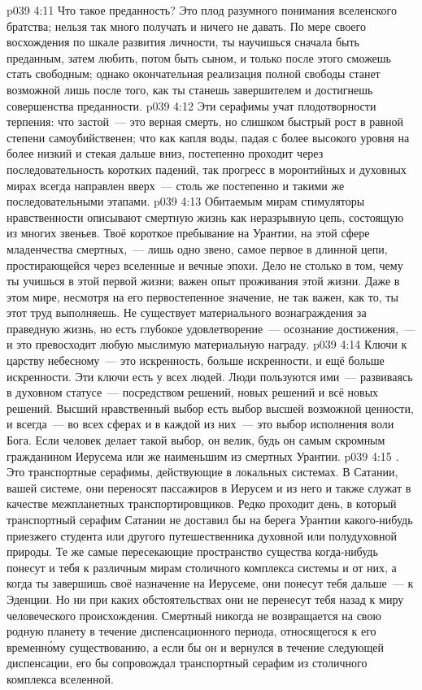 \vs p039 4:11 Что такое преданность? Это плод разумного понимания вселенского братства; нельзя так много получать и ничего не давать. По мере своего восхождения по шкале развития личности, ты научишься сначала быть преданным, затем любить, потом быть сыном, и только после этого сможешь стать свободным; однако окончательная реализация полной свободы станет возможной лишь после того, как ты станешь завершителем и достигнешь совершенства преданности.
\vs p039 4:12 \pc Эти серафимы учат плодотворности терпения: что застой~--- это верная смерть, но слишком быстрый рост в равной степени самоубийственен; что как капля воды, падая с более высокого уровня на более низкий и стекая дальше вниз, постепенно проходит через последовательность коротких падений, так прогресс в моронтийных и духовных мирах всегда направлен вверх~--- столь же постепенно и такими же последовательными этапами.
\vs p039 4:13 Обитаемым мирам стимуляторы нравственности описывают смертную жизнь как неразрывную цепь, состоящую из многих звеньев. Твоё короткое пребывание на Урантии, на этой сфере младенчества смертных,~--- лишь одно звено, самое первое в длинной цепи, простирающейся через вселенные и вечные эпохи. Дело не столько в том, чему ты учишься в этой первой жизни; важен опыт проживания этой жизни. Даже  в этом мире, несмотря на его первостепенное значение, не так важен, как то,  ты этот труд выполняешь. Не существует материального вознаграждения за праведную жизнь, но есть глубокое удовлетворение~--- осознание достижения,~--- и это превосходит любую мыслимую материальную награду.
\vs p039 4:14 Ключи к царству небесному~--- это искренность, больше искренности, и ещё больше искренности. Эти ключи есть у всех людей. Люди пользуются ими~--- развиваясь в духовном статусе~--- посредством решений, новых решений и всё новых решений. Высший нравственный выбор есть выбор высшей возможной ценности, и всегда~--- во всех сферах и в каждой из них~--- это выбор исполнения воли Бога. Если человек делает такой выбор, он  велик, будь он самым скромным гражданином Иерусема или же наименьшим из смертных Урантии.
\vs p039 4:15 . Это транспортные серафимы, действующие в локальных системах. В Сатании, вашей системе, они переносят пассажиров в Иерусем и из него и также служат в качестве межпланетных транспортировщиков. Редко проходит день, в который транспортный серафим Сатании не доставил бы на берега Урантии какого\hyp{}нибудь приезжего студента или другого путешественника духовной или полудуховной природы. Те же самые пересекающие пространство существа когда\hyp{}нибудь понесут и тебя к различным мирам столичного комплекса системы и от них, а когда ты завершишь своё назначение на Иерусеме, они понесут тебя дальше~--- к Эденции. Но ни при каких обстоятельствах они не перенесут тебя назад к миру человеческого происхождения. Смертный никогда не возвращается на свою родную планету в течение диспенсационного периода, относящегося к его временн\'ому существованию, а если бы он и вернулся в течение следующей диспенсации, его бы сопровождал транспортный серафим из столичного комплекса вселенной.
